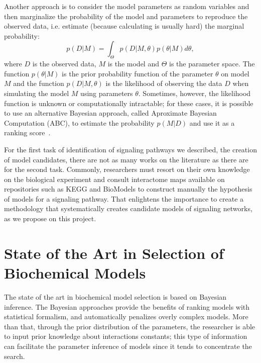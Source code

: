 Another approach is to consider the model parameters as random variables 
and then marginalize the probability of the model and parameters to 
reproduce the observed data, i.e. estimate (because calculating is 
usually hard) the marginal probability:
\begin{equation}
    p (D | M) = \int_{\Theta} p (D | M, \theta) p (\theta | M) d\theta,
    \label{eq:marginal_likelihood_integral}
\end{equation}
where $D$ is the observed data, $M$ is the model and $\Theta$ is the 
parameter space. The function $p(\theta | M)$ is the prior probability 
function of the parameter $\theta$ on model $M$ and the function 
$p (D | M, \theta)$ is the likelihood of observing the data $D$ when
simulating the model $M$ using parameters $\theta$. Sometimes, however,
the likelihood function is unknown or computationally intractable; for
these cases, it is possible to use an alternative Bayesian approach, 
called Aproximate Bayesian Computation (ABC), to estimate the 
probability $p (M | D)$ and use it as a ranking score~\cite{Toni2009}.

For the first task of identification of signaling pathways we described, 
the creation of model candidates, there are not as many works on the 
literature as there are for the second task. Commonly, researchers must 
resort on their own knowledge on the biological experiment and consult 
interactome maps available on repositories such as KEGG and BioModels to
construct manually the hypothesis of models for a signaling pathway. 
That enlightens the importance to create a methodology that 
systematically creates candidate models of signaling networks, as we 
propose on this project.



\section{State of the Art in Selection of Biochemical Models}
The state of the art in biochemical model selection is based on Bayesian
inference. The Bayesian approaches provide the benefits of ranking 
models with statistical formalism, and automatically penalizes overly 
complex models. More than that, through the prior distribution of the
parameters, the researcher is able to input prior knowledge about 
interactions constants; this type of information can facilitate the 
parameter inference of models since it tends to concentrate the search.

